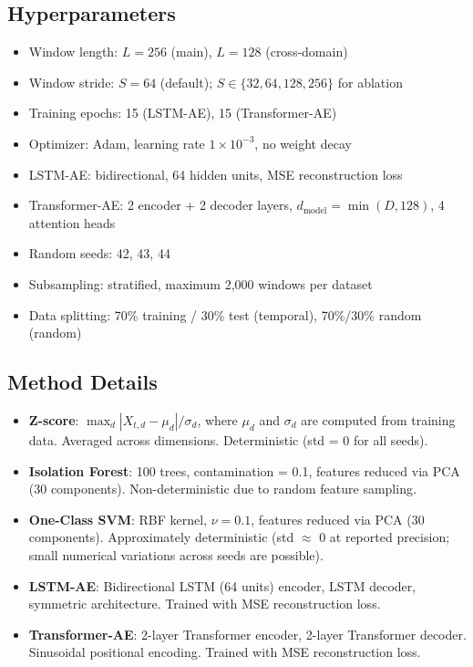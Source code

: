 \documentclass[12pt]{article}
\begin{document}
\subsection{Hyperparameters}
\begin{itemize}
    \item Window length: $L = 256$ (main), $L = 128$ (cross-domain)
    \item Window stride: $S = 64$ (default); $S \in \{32, 64, 128, 256\}$ for ablation
    \item Training epochs: 15 (LSTM-AE), 15 (Transformer-AE)
    \item Optimizer: Adam, learning rate $1\times10^{-3}$, no weight decay
    \item LSTM-AE: bidirectional, 64 hidden units, MSE reconstruction loss
    \item Transformer-AE: 2 encoder + 2 decoder layers, $d_\text{model} = \min(D, 128)$, 4 attention heads
    \item Random seeds: 42, 43, 44
    \item Subsampling: stratified, maximum 2,000 windows per dataset
    \item Data splitting: 70\% training / 30\% test (temporal), 70\%/30\% random (random)
\end{itemize}

\subsection{Method Details}
\begin{itemize}
    \item \textbf{Z-score}: $\max_d |X_{t,d} - \mu_d| / \sigma_d$, where $\mu_d$ and $\sigma_d$ are computed from training data. Averaged across dimensions. Deterministic (std = 0 for all seeds).
    \item \textbf{Isolation Forest}: 100 trees, contamination = 0.1, features reduced via PCA (30 components). Non-deterministic due to random feature sampling.
    \item \textbf{One-Class SVM}: RBF kernel, $\nu = 0.1$, features reduced via PCA (30 components). Approximately deterministic (std $\approx$ 0 at reported precision; small numerical variations across seeds are possible).
    \item \textbf{LSTM-AE}: Bidirectional LSTM (64 units) encoder, LSTM decoder, symmetric architecture. Trained with MSE reconstruction loss.
    \item \textbf{Transformer-AE}: 2-layer Transformer encoder, 2-layer Transformer decoder. Sinusoidal positional encoding. Trained with MSE reconstruction loss.
\end{itemize}
\end{document}
